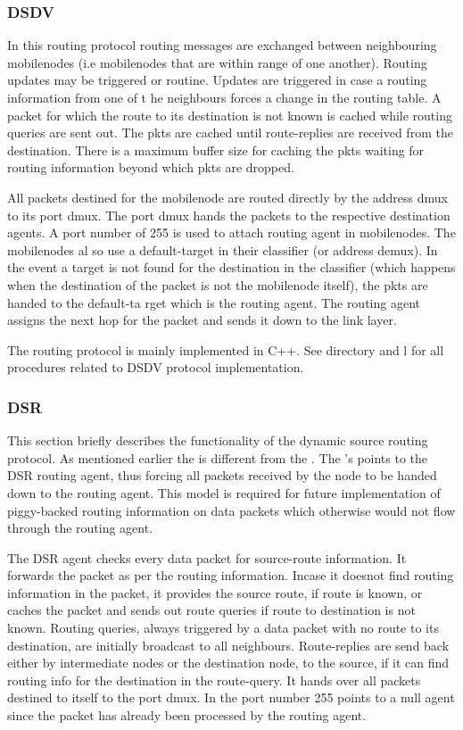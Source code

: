\subsubsection{DSDV}
\label{sec:dsdv}

In this routing protocol routing messages are exchanged between
neighbouring mobilenodes (i.e mobilenodes that are within range of one
another). Routing updates may be triggered or routine. Updates are
triggered in case a routing information from one of t   
he neighbours forces a change in the routing table.
A packet for which the route to its destination is not known is cached
while routing queries are sent out. The pkts are cached until
route-replies are received from the destination. There is a maximum buffer
size for caching the pkts waiting for routing information beyond which
pkts are dropped. 

All packets destined for the mobilenode are routed directly by the address
dmux to its port dmux. The port dmux hands the packets to the respective
destination agents. A port number of 255 is used to attach routing agent
in mobilenodes. The mobilenodes al
so use a default-target in their classifier (or address demux). In the
event a target is not found for the destination in the classifier (which
happens when the destination of the packet is not the mobilenode itself),
the pkts are handed to the default-ta   
rget which is the routing agent. The routing agent assigns the next hop
for the packet and sends it down to the link layer. 

The routing protocol is mainly implemented in C++. See 
directory and l for all procedures related to
DSDV protocol implementation.  

\subsubsection{DSR}
\label{sec:dsr}

This section briefly describes the functionality of the dynamic source
routing protocol. As mentioned earlier the  is different from
the .  The 's  points to the
DSR routing agent, thus forcing all    
packets received by the node to be handed down to the routing agent. This
model is required for future implementation of piggy-backed routing
information on data packets which otherwise would not flow through the
routing agent.   

The DSR agent checks every data packet for source-route information. It
forwards the packet as per the routing information. Incase it doesnot find
routing information in the packet, it provides the source route, if route
is known, or caches the packet and   
sends out route queries if route to destination is not known. Routing
queries, always triggered by a data packet with no route to its
destination, are initially broadcast to all neighbours. Route-replies are
send back either by intermediate nodes or the 
destination node, to the source, if it can find routing info for the
destination in the route-query.  It hands over all packets destined to
itself to the port dmux.  
In  the port number 255 points to a null agent since the
packet has already been processed by the routing agent. 

